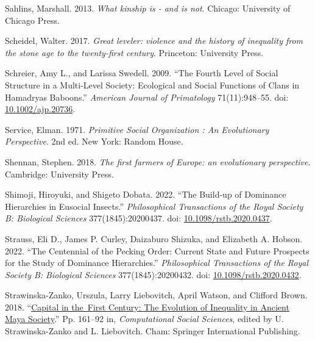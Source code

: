 \documentclass[
  12pt,
]{book}
\newlength{\cslhangindent}
\newlength{\cslentryspacingunit} %
\newenvironment{CSLReferences}[2] %
 {%
  \setlength{\parindent}{0pt}
  \ifodd #1
  \let\oldpar\par
  \def\par{\hangindent=\cslhangindent\oldpar}
  \fi
  \setlength{\parskip}{#2\cslentryspacingunit}
 }%
 {}
\begin{document}
\begin{CSLReferences}{1}{0}
\leavevmode{}%
Sahlins, Marshall. 2013. \emph{What kinship is - and is not}. Chicago: University of Chicago Press.

\leavevmode{}%
Scheidel, Walter. 2017. \emph{Great leveler: violence and the history of inequality from the stone age to the twenty-first century}. Princeton: University Press.

\leavevmode{}%
Schreier, Amy L., and Larissa Swedell. 2009. {``The Fourth Level of Social Structure in a Multi-Level Society: Ecological and Social Functions of Clans in Hamadryas Baboons.''} \emph{American Journal of Primatology} 71(11):948--55. doi: \href{https://doi.org/10.1002/ajp.20736}{10.1002/ajp.20736}.

\leavevmode{}%
Service, Elman. 1971. \emph{Primitive Social Organization : An Evolutionary Perspective}. 2nd ed. New York: Random House.

\leavevmode{}%
Shennan, Stephen. 2018. \emph{The first farmers of Europe: an evolutionary perspective}. Cambridge: University Press.

\leavevmode{}%
Shimoji, Hiroyuki, and Shigeto Dobata. 2022. {``The Build-up of Dominance Hierarchies in Eusocial Insects.''} \emph{Philosophical Transactions of the Royal Society B: Biological Sciences} 377(1845):20200437. doi: \href{https://doi.org/10.1098/rstb.2020.0437}{10.1098/rstb.2020.0437}.

\leavevmode{}%
Strauss, Eli D., James P. Curley, Daizaburo Shizuka, and Elizabeth A. Hobson. 2022. {``The Centennial of the Pecking Order: Current State and Future Prospects for the Study of Dominance Hierarchies.''} \emph{Philosophical Transactions of the Royal Society B: Biological Sciences} 377(1845):20200432. doi: \href{https://doi.org/10.1098/rstb.2020.0432}{10.1098/rstb.2020.0432}.

\leavevmode{}%
Strawinska-Zanko, Urszula, Larry Liebovitch, April Watson, and Clifford Brown. 2018. {``\href{https://doi.org/10.1007/978-3-319-76765-9_9}{Capital in the~First Century: The Evolution of Inequality in Ancient Maya Society}.''} Pp. 161--92 in, \emph{Computational Social Sciences}, edited by U. Strawinska-Zanko and L. Liebovitch. Cham: Springer International Publishing.


\end{CSLReferences}
\end{document}
